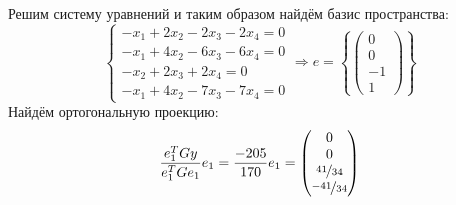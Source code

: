 \documentclass{article}
\begin{document}
\begin{center}
    Решим систему уравнений и таким образом найдём базис пространства:
    $$
        \begin{cases}
            -x_1+2x_2-2x_3-2x_4 = 0 \\
            -x_1+4x_2-6x_3-6x_4 = 0 \\
            -x_2+2x_3+2x_4 = 0 \\
            -x_1+4x_2-7x_3-7x_4 = 0
        \end{cases} \Rightarrow e = \left\{\begin{pmatrix}
            0 \\ 0 \\ -1 \\ 1
        \end{pmatrix}\right\}
    $$
    Найдём ортогональную проекцию:
    $$
        \frac{e_1^{T}Gy}{e_1^TGe_1}e_1  = \frac{-205}{170}e_1 = \begin{pmatrix}
            0 \\ 0 \\ \nicefrac{41}{34} \\ \nicefrac{-41}{34}
        \end{pmatrix}
    $$
\end{center}
\end{document}
